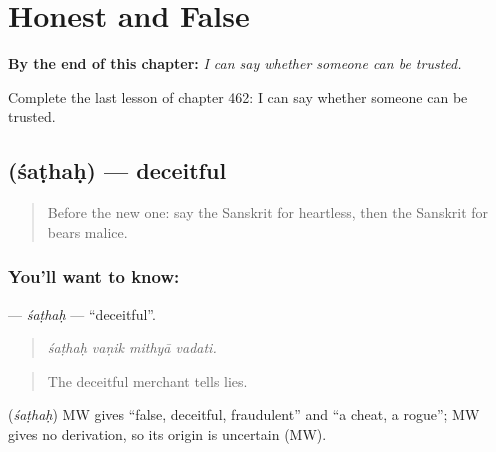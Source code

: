 
\chapter{Honest and False}
\label{ch:sa-honest-and-false}

\begin{chapteropening}
\textbf{By the end of this chapter:} \emph{I can say whether someone can be trusted.}

Complete the last lesson of chapter 462: I can say whether someone can be trusted.
\end{chapteropening}

\section[\texorpdfstring{\sk{शठः} (śaṭhaḥ)}{शठः (śaṭhaḥ)}]{ (śaṭhaḥ) — deceitful}

\label{lesson:SA-C462-sathah}



\begin{quote}
Before the new one: say the Sanskrit for heartless, then the Sanskrit for bears malice.
\end{quote}

\subsection*{You'll want to know: }
\textbf{} — \emph{śaṭhaḥ} — \textquotedblleft{}deceitful\textquotedblright{}.

\begin{quote}
   
\end{quote}

\begin{quote}
\emph{śaṭhaḥ vaṇik mithyā vadati.}
\end{quote}

\begin{quote}
The deceitful merchant tells lies.
\end{quote}

\begin{cousinweb}
\textbf{} (\emph{śaṭhaḥ}) MW gives \textquotedblleft{}false, deceitful, fraudulent\textquotedblright{} and \textquotedblleft{}a cheat, a rogue\textquotedblright{}; MW gives no derivation, so its origin is uncertain (MW).
\end{cousinweb}

